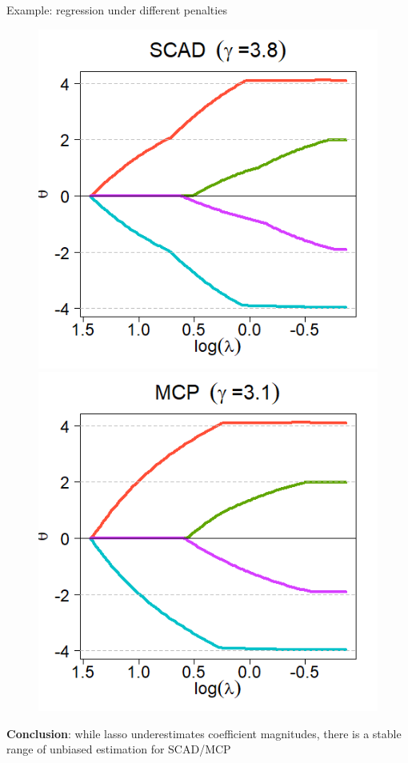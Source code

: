 \documentclass[11pt,compress,t,notes=noshow, xcolor=table]{beamer}
\begin{document}
\begin{vbframe}{Example: regression under different penalties}
\begin{figure}[h]
\begin{minipage}{0.32\linewidth}
      \centerline{\includegraphics[width=\textwidth]{figure/other-pen-SCAD.png}}
    \end{minipage}
    \begin{minipage}{0.32\linewidth}
      \vspace{3pt}
      \centerline{\includegraphics[width=\textwidth]{figure/other-pen-MCP.png}}
    \end{minipage}
  \end{figure}

\textbf{Conclusion}: while lasso underestimates coefficient magnitudes, there is a stable range of unbiased estimation for SCAD/MCP

\end{vbframe}
\end{document}
